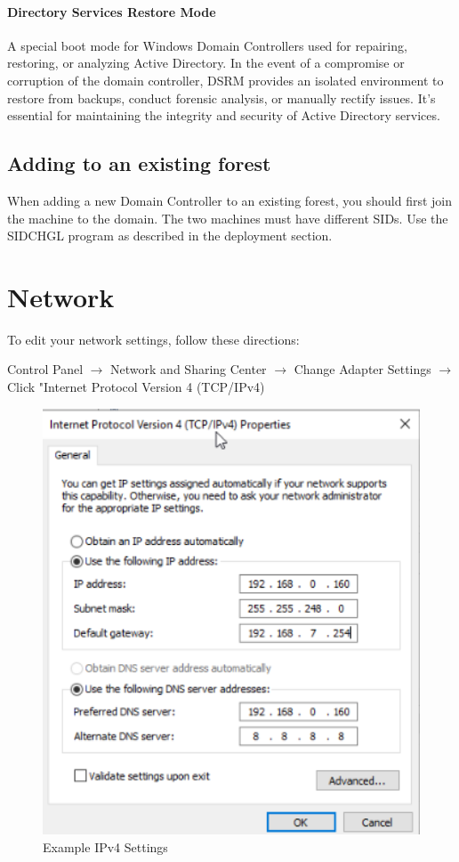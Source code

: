 \documentclass{article}
\begin{document}
\paragraph{Directory Services Restore Mode}
A special boot mode for Windows Domain Controllers used for repairing, 
restoring, or analyzing Active Directory. In the event of a compromise 
or corruption of the domain controller, DSRM provides an isolated 
environment to restore from backups, conduct forensic analysis, or 
manually rectify issues. It's essential for maintaining the integrity 
and security of Active Directory services.

\subsection{Adding to an existing forest}
When adding a new Domain Controller to an existing forest, you should first join the machine to the domain.
The two machines must have different SIDs. Use the SIDCHGL program as described in the deployment section. 

\section{Network}
To edit your network settings, follow these directions:

Control Panel $\rightarrow$ Network and Sharing Center $\rightarrow$
Change Adapter Settings $\rightarrow$ Click "Internet Protocol Version 4 (TCP/IPv4)

\begin{figure}[]
        \centering
        \includegraphics[width=1\textwidth]{SampleDCIPv4.png}
        \caption{Example IPv4 Settings}
        \label{fig:IPv4Settings}
\end{figure}
\end{document}
